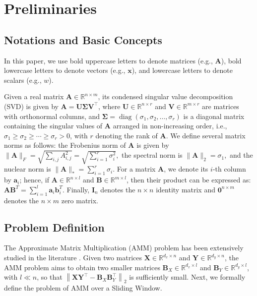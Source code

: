 \section{Preliminaries}
\label{sec:sec-Preliminary}






\subsection{Notations and Basic Concepts}

In this paper, we use bold uppercase letters to denote matrices (e.g., $\boldsymbol{A}$), bold lowercase letters to denote vectors (e.g., $\boldsymbol{x}$), and lowercase letters to denote scalars (e.g., $w$).


Given a real matrix \(\boldsymbol{A} \in \mathbb{R}^{n\times m}\), its condensed singular value decomposition (SVD) is given by \(\boldsymbol{A} = \boldsymbol{U} \boldsymbol{\Sigma} \boldsymbol{V}^\top\), where \(\boldsymbol{U} \in \mathbb{R}^{n \times r}\) and \(\boldsymbol{V} \in \mathbb{R}^{m \times r}\) are matrices with orthonormal columns, and \(\boldsymbol{\Sigma} = \operatorname{diag}(\sigma_1, \sigma_2, \dots, \sigma_r)\) is a diagonal matrix containing the singular values of \(\boldsymbol{A}\) arranged in non-increasing order, i.e., \(\sigma_1 \geq \sigma_2 \geq \cdots \geq \sigma_r > 0\), with \(r\) denoting the rank of \(\boldsymbol{A}\). We define several matrix norms as follows: the Frobenius norm of \(\boldsymbol{A}\) is given by 
\(
\|\boldsymbol{A}\|_F = \sqrt{\sum_{i,j} A_{i,j}^2} = \sqrt{\sum_{i=1}^r \sigma_i^2},
\)
the spectral norm is 
\(
\|\boldsymbol{A}\|_2 = \sigma_1,
\)
and the nuclear norm is 
\(
\|\boldsymbol{A}\|_* = \sum_{i=1}^r \sigma_i.
\)
For a matrix \(\boldsymbol{A}\), we denote its \(i\)-th column by \(\boldsymbol{a}_i\); hence, if \(\boldsymbol{A} \in \mathbb{R}^{n \times l}\) and \(\boldsymbol{B} \in \mathbb{R}^{m \times l}\), then their product can be expressed as: 
\(
\boldsymbol{A}\boldsymbol{B}^T = \sum_{i=1}^l \boldsymbol{a}_i \boldsymbol{b}_i^T.
\)
Finally, \(\boldsymbol{I}_n\) denotes the \(n \times n\) identity matrix and \(\boldsymbol{0}^{n \times m}\) denotes the \(n \times m\) zero matrix.








\subsection{Problem Definition}
The Approximate Matrix Multiplication (AMM) problem has been extensively studied in the literature \cite{YeLZ16,MrouehMG17,drineas2006fast,FrancisR22}. Given two matrices \(\boldsymbol{X} \in \mathbb{R}^{d_x \times n}\) and \(\boldsymbol{Y} \in \mathbb{R}^{d_y \times n}\), the AMM problem aims to obtain two smaller matrices \(\boldsymbol{B}_X \in \mathbb{R}^{d_x \times l}\) and \(\boldsymbol{B}_Y \in \mathbb{R}^{d_y \times l}\), with \(l \ll n\), so that
\(
\left\|\boldsymbol{X}\boldsymbol{Y}^\top - \boldsymbol{B}_X \boldsymbol{B}_Y^\top\right\|_2
\) is sufficiently small. Next, we formally define the problem of AMM over a Sliding Window.

